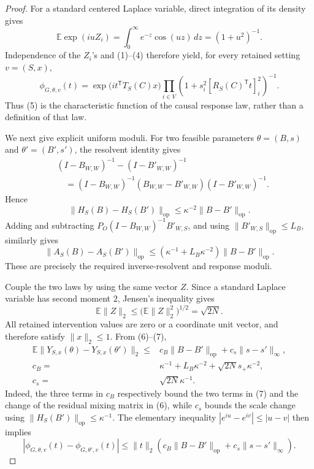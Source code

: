 \documentclass{article}
\begin{document}
\begin{proof}
For a standard centered Laplace variable, direct integration of its density
gives
\[
 \mathbb E\exp(iuZ_i)
 =\int_0^\infty e^{-z}\cos(uz)\,dz
 =(1+u^2)^{-1}.
\]
Independence of the \(Z_i\)'s and (1)--(4) therefore yield, for every retained
setting \(v=(S,x)\),
\[
 \phi_{G,\theta,v}(t)
 =\exp\!\bigl(i t^{\mathsf T}T_S(C)x\bigr)
   \prod_{i\in V}
   \left(1+s_i^2[R_S(C)^{\mathsf T}t]_i^2\right)^{-1}.
 \tag{5}
\]
Thus (5) is the characteristic function of the causal response law, rather
than a definition of that law.

We next give explicit uniform moduli.  For two feasible parameters
\(\theta=(B,s)\) and \(\theta'=(B',s')\), the resolvent identity gives
\[
 \begin{split}
 &(I-B_{W,W})^{-1}-(I-B'_{W,W})^{-1}\\
 &\quad=(I-B_{W,W})^{-1}(B_{W,W}-B'_{W,W})
          (I-B'_{W,W})^{-1}.
 \end{split}
\]
Hence
\[
 \lVert H_S(B)-H_S(B')\rVert_{\mathrm{op}}
 \leq\kappa^{-2}\lVert B-B'\rVert_{\mathrm{op}}.
 \tag{6}
\]
Adding and subtracting
\(P_O(I-B_{W,W})^{-1}B'_{W,S}\), and using
\(\lVert B'_{W,S}\rVert_{\mathrm{op}}\leq L_B\), similarly gives
\[
 \lVert A_S(B)-A_S(B')\rVert_{\mathrm{op}}
 \leq(\kappa^{-1}+L_B\kappa^{-2})
       \lVert B-B'\rVert_{\mathrm{op}}.
 \tag{7}
\]
These are precisely the required inverse-resolvent and response moduli.

Couple the two laws by using the same vector \(Z\).  Since a standard
Laplace variable has second moment \(2\), Jensen's inequality gives
\[
 \mathbb E\lVert Z\rVert_2
 \leq\bigl(\mathbb E\lVert Z\rVert_2^2\bigr)^{1/2}
 =\sqrt{2N}.
\]
All retained intervention values are zero or a coordinate unit vector, and
therefore satisfy \(\lVert x\rVert_2\leq1\).  From (6)--(7),
\[
 \begin{split}
 \mathbb E\lVert Y_{S,x}(\theta)-Y_{S,x}(\theta')\rVert_2
 \leq{}&c_B\lVert B-B'\rVert_{\mathrm{op}}
       +c_s\lVert s-s'\rVert_\infty,\\
 c_B={}&\kappa^{-1}+L_B\kappa^{-2}
          +\sqrt{2N}s_+\kappa^{-2},\\
 c_s={}&\sqrt{2N}\kappa^{-1}.
 \end{split}
 \tag{8}
\]
Indeed, the three terms in \(c_B\) respectively bound the two terms in
(7) and the change of the residual mixing matrix in (6), while \(c_s\)
bounds the scale change using
\(\lVert H_S(B')\rVert_{\mathrm{op}}\leq\kappa^{-1}\).
The elementary inequality \(|e^{iu}-e^{iv}|\leq|u-v|\) then implies
\[
 |\phi_{G,\theta,v}(t)-\phi_{G,\theta',v}(t)|
 \leq\lVert t\rVert_2
 \left(c_B\lVert B-B'\rVert_{\mathrm{op}}
       +c_s\lVert s-s'\rVert_\infty\right).
 \tag{9}
\]


\end{proof}
\end{document}
